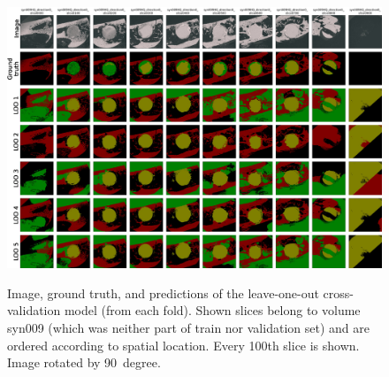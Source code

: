 \clearpage
\begin{figure}[!htb]
    \centering
    \includegraphics[clip,trim={0 0 0 7}, height=\textwidth, angle=90]{pictures/experiment_2/base-case_LOO_example_predictions_2_all_folds}\\
    \caption[Predictions with Leave-one-out Cross-validation]{Image, ground truth, and predictions of the leave-one-out cross-validation model (from each fold). Shown slices belong to volume syn009 (which was neither part of train nor validation set) and are ordered according to spatial location. Every 100th slice is shown. Image rotated by 90~degree.}
    \label{fig:loo-predictions-syn009-by-fold}
\end{figure}


